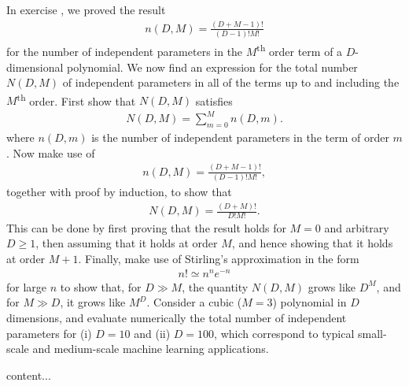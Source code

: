 \begin{question}{1.16}
	In exercise , we proved the result
	\begin{align*}
		n(D, M) = \frac{(D + M - 1)!}{(D-1)!M!}
	\end{align*}
	for the number of independent parameters in the $M$\textsuperscript{th} order term of a $D$-dimensional polynomial. We now find an expression for the total number $N(D, M)$ of independent parameters in all of the terms up to and including the $M$\textsuperscript{th} order. First show that $N(D, M)$ satisfies
	\begin{align*}
		N(D, M) = \sum_{m = 0}^{M} n(D, m).
	\end{align*}
	where $n(D, m)$ is the number of independent parameters in the term of order $m$. Now make use of
	\begin{align*}
		n(D,M) = \frac{(D + M - 1)!}{(D-1)!M!},
	\end{align*}
	together with proof by induction, to show that
	\begin{align*}
		N(D, M) = \frac{(D + M)!}{D!M!}.
	\end{align*}
	This can be done by first proving that the result holds for $M = 0$ and arbitrary $D \geq 1$, then assuming that it holds at order $M$, and hence showing that it holds at order $M + 1$. Finally, make use of Stirling's approximation in the form
	\begin{align*}
		n! \simeq n^n e^{-n}
	\end{align*}
	for large $n$ to show that, for $D \gg M$, the quantity $N(D, M)$ grows like $D^M$, and for $M \gg D$, it grows like $M^D$. Consider a cubic ($M = 3$) polynomial in $D$ dimensions, and evaluate numerically the total number of independent parameters for (i) $D = 10$ and (ii) $D = 100$, which correspond to typical small-scale and medium-scale machine learning applications.
\end{question}

\begin{answer}{}
	content...
\end{answer}